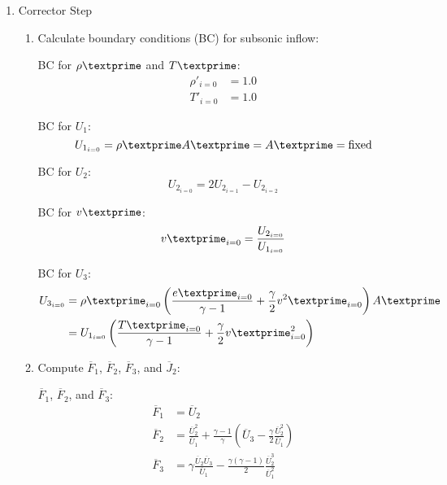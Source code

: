 \documentclass[12pt]{article}
\begin{document}
\begin{enumerate}
\begin{enumerate}
\begin{enumerate}
		\end{enumerate}
		\item Corrector Step
		\begin{enumerate}
			\item Calculate boundary conditions (BC) for subsonic inflow:
				\par BC for $\rho\textprime$ and $T\textprime$:
				\begin{align}
					\rho'_{i=0}	&= 1.0 \\
					T'_{i=0}	&= 1.0
				\end{align}
				\par BC for $U_{1}$:
				\begin{equation}
					U_{1_{i=0}} = \rho\textprime A\textprime = A\textprime = \text{fixed}
				\end{equation}
				\par BC for $U_{2}$:
				\begin{equation}
					U_{2_{i=0}} = 2U_{2_{i=1}} - U_{2_{i=2}}
				\end{equation}
				\par BC for $v\textprime$:
				\begin{equation}
					v\textprime_{i=0} = \frac{U_{2_{i=0}}}{U_{1_{i=0}}}
				\end{equation}
				\par BC for $U_{3}$:
				\begin{align}
					U_{3_{i=0}} 	&= \rho\textprime_{i=0}\left(\frac{e\textprime_{i=0}}{\gamma - 1} + \frac{\gamma}{2}v^{2}\textprime_{i=0}\right)A\textprime \\
						&= U_{1_{i=0}}\left(\frac{T\textprime_{i=0}}{\gamma - 1} + \frac{\gamma}{2}v\textprime^{2}_{i=0}\right)
				\end{align}
			\item Compute $\overline{F}_1$, $\overline{F}_2$, $\overline{F}_3$, and $\overline{J}_2$:
				\par $\overline{F}_{1}$, $\overline{F}_{2}$, and $\overline{F}_{3}$:
				\begin{align}
					\overline{F}_{1}	&= \overline{U}_{2} \\
					\overline{F}_{2}	&= \frac{\overline{U}_{2}^{2}}{\overline{U}_{1}} + \frac{\gamma - 1}{\gamma}\left(\overline{U}_{3} - \frac{\gamma}{2}\frac{\overline{U}_{2}^{2}}{\overline{U}_{1}}\right) \\
					\overline{F}_{3}	&= \gamma\frac{\overline{U}_{2}\overline{U}_{3}}{\overline{U}_{1}} - \frac{\gamma\left(\gamma - 1\right)}{2}\frac{\overline{U}_{2}^{3}}{\overline{U}_{1}^{2}}
				\end{align}

\end{enumerate}
\end{enumerate}
\end{enumerate}
\end{document}
